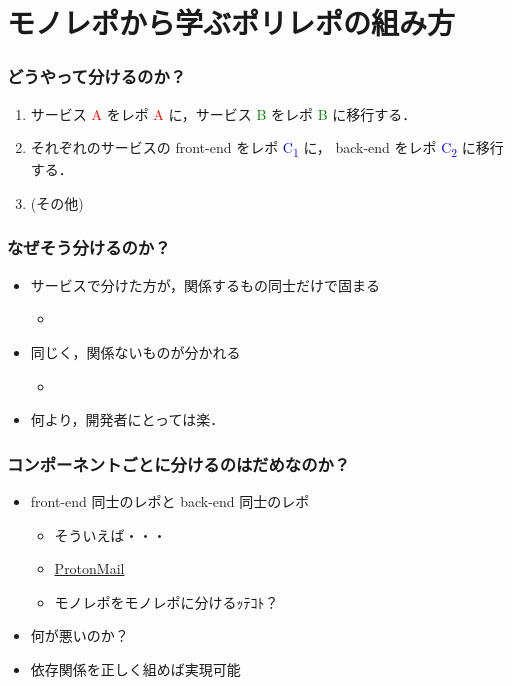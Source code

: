 \section{モノレポから学ぶポリレポの組み方}

\begin{frame}
    \frametitle{どうやって分けるのか？}
    \begin{enumerate}
        \item<2-> サービス \textcolor{red}{A} をレポ \textcolor{red}{A} に，サービス \textcolor{green}{B} をレポ \textcolor{green}{B} に移行する．
        \item<3-> それぞれのサービスの front-end をレポ \textcolor{blue}{C\textsubscript{1}} に， back-end をレポ \textcolor{blue}{C\textsubscript{2}} に移行する．
        \item<4-> (その他)
    \end{enumerate}
\end{frame}

\begin{frame}
    \frametitle{なぜそう分けるのか？}
    \begin{itemize}
        \item<2-> サービスで分けた方が，関係するもの同士だけで固まる
        \begin{itemize}
            \item<3-> 
        \end{itemize}
        \item<4-> 同じく，関係ないものが分かれる
        \begin{itemize}
            \item<5-> 
        \end{itemize}
        \item<6-> 何より，開発者にとっては楽．
    \end{itemize}
\end{frame}

\begin{frame}
    \frametitle{コンポーネントごとに分けるのはだめなのか？}

    \begin{itemize}
        \item<2-> front-end 同士のレポと back-end 同士のレポ
        \begin{itemize}
            \item<3-> そういえば・・・
            \item<4-> \href{https://github.com/ProtonMail/WebClients}{ProtonMail}
            \item<5-> モノレポをモノレポに分けるｯﾃｺﾄ？
        \end{itemize}
        \item<6-> 何が悪いのか？
        \item<7-> 依存関係を正しく組めば実現可能
    \end{itemize}

\end{frame}

